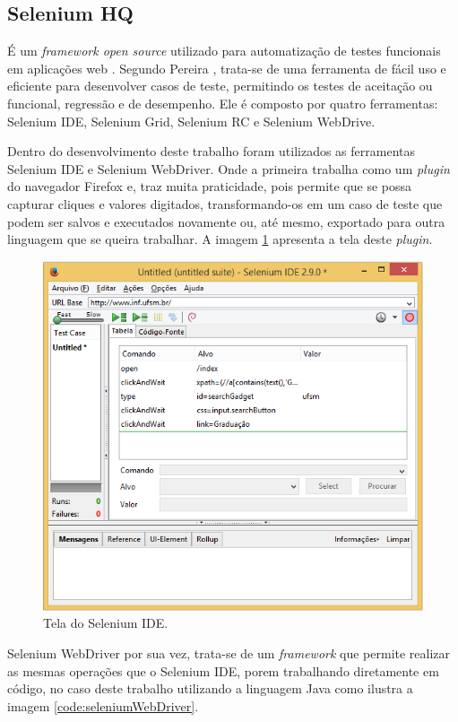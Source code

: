 \documentclass[tg]{mdtufsm}
\begin{document}
\subsection{Selenium HQ}
É um \emph{framework open source} utilizado para automatização de testes funcionais em aplicações web \cite{chiavegatto1desenvolvimento}. Segundo Pereira \citeyearpar{pereiraestudoselenium}, trata-se
de uma ferramenta de fácil uso e eficiente para desenvolver casos de teste, permitindo os testes de aceitação ou funcional, regressão e de desempenho.
Ele é composto por quatro ferramentas: Selenium IDE, Selenium Grid, Selenium RC e Selenium WebDrive.

Dentro do desenvolvimento deste trabalho foram utilizados as ferramentas Selenium IDE e Selenium WebDriver. Onde a primeira trabalha como um \emph{plugin} do navegador Firefox e, traz muita praticidade, pois permite que se possa capturar cliques e valores digitados, transformando-os em um caso de teste que podem ser salvos e executados novamente ou, até mesmo, exportado para outra linguagem que se queira trabalhar. A imagem \ref{fig:seleniumIDE} apresenta a tela deste \emph{plugin}.

\begin{figure}[!htb]
	\centering
	\includegraphics[width=0.7
	\textwidth]{selenium_ide}
	\caption{Tela do Selenium IDE.}
	\label{fig:seleniumIDE}
\end{figure}

Selenium WebDriver por sua vez, trata-se de um \emph{framework} que permite realizar as mesmas operações que o Selenium IDE, porem trabalhando diretamente em código, no caso deste trabalho utilizando a linguagem Java como ilustra a imagem \ref{code:seleniumWebDriver}.
\end{document}
